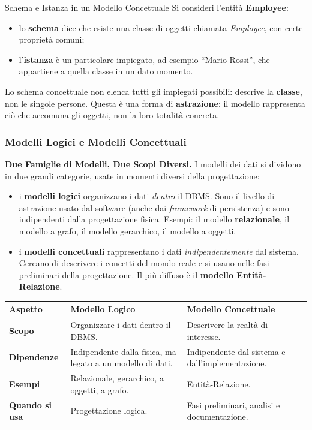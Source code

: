 \documentclass[12pt]{extarticle}
\begin{document}
\begin{cbox}{Schema e Istanza in un Modello Concettuale}
\noindent Si consideri l'entità \textbf{Employee}:
\begin{itemize}
    \item lo \textbf{schema} dice che esiste una classe di oggetti chiamata \textit{Employee}, con certe proprietà comuni;
    \item l'\textbf{istanza} è un particolare impiegato, ad esempio ``Mario Rossi'', che appartiene a quella classe in un dato momento.
\end{itemize}
Lo schema concettuale non elenca tutti gli impiegati possibili: descrive la \textbf{classe}, non le singole persone. Questa è una forma di \textbf{astrazione}: il modello rappresenta ciò che accomuna gli oggetti, non la loro totalità concreta.
\end{cbox}

\subsubsection{Modelli Logici e Modelli Concettuali}

\noindent \textbf{Due Famiglie di Modelli, Due Scopi Diversi.} I modelli dei dati si dividono in due grandi categorie, usate in momenti diversi della progettazione:
\begin{itemize}
    \item i \textbf{modelli logici} organizzano i dati \textit{dentro} il DBMS. Sono il livello di astrazione usato dal software (anche dai \textit{framework} di persistenza) e sono indipendenti dalla progettazione fisica. Esempi: il modello \textbf{relazionale}, il modello a grafo, il modello gerarchico, il modello a oggetti.
    \item i \textbf{modelli concettuali} rappresentano i dati \textit{indipendentemente} dal sistema. Cercano di descrivere i concetti del mondo reale e si usano nelle fasi preliminari della progettazione. Il più diffuso è il \textbf{modello Entità-Relazione}.
\end{itemize}

\begin{center}
\small
\begin{tabular}{@{}L{4.0cm}L{6.1cm}L{6.3cm}@{}}
    \toprule
    \textbf{Aspetto} & \textbf{Modello Logico} & \textbf{Modello Concettuale} \\
    \midrule
    \textbf{Scopo} & Organizzare i dati dentro il DBMS. & Descrivere la realtà di interesse. \\
    \addlinespace
    \textbf{Dipendenze} & Indipendente dalla fisica, ma legato a un modello di dati. & Indipendente dal sistema e dall'implementazione. \\
    \addlinespace
    \textbf{Esempi} & Relazionale, gerarchico, a oggetti, a grafo. & Entità-Relazione. \\
    \addlinespace
    \textbf{Quando si usa} & Progettazione logica. & Fasi preliminari, analisi e documentazione. \\
    \bottomrule
\end{tabular}
\end{center}
\end{document}
